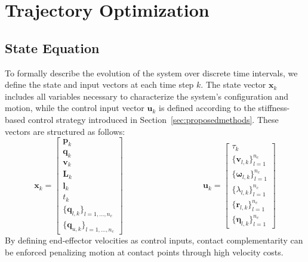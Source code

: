 \documentclass[main.tex]{subfiles}
\begin{document}
\begin{sloppypar}
\section{Trajectory Optimization}
\label{sec:formulation}
\subsection{State Equation}
To formally describe the evolution of the system over discrete time intervals, we define the state and input vectors at each time step \( k \). The state vector \( \mathbf{x}_k \) includes all variables necessary to characterize the system’s configuration and motion, while the control input vector \( \mathbf{u}_k \) is defined according to the stiffness-based control strategy introduced in Section~\ref{sec:proposedmethods}. These vectors are structured as follows:
\begin{equation}
\mathbf{x}_k =
\begin{bmatrix}
\mathbf{p}_k \\
\mathbf{q}_k \\
\mathbf{v}_k \\
\mathbf{L}_k \\
\mathbf{l}_k \\
t_k \\
\{\mathbf{q}_{l,k}\}_{l=1,\ldots,n_c} \\
\{\mathbf{q}_{u,k}\}_{l=1,\ldots,n_c}
\end{bmatrix}
\hspace{4cm}
\mathbf{u}_k =
\begin{bmatrix}
\tau_k \\
\{\mathbf{v}_{l,k}\}_{l=1}^{n_c} \\
\{\boldsymbol{\omega}_{l,k}\}_{l=1}^{n_c} \\
\{\lambda_{l,k}\}_{l=1}^{n_c} \\
\{\mathbf{r}_{l,k}\}_{l=1}^{n_c} \\
\{\boldsymbol{\eta}_{l,k}\}_{l=1}^{n_c}
\end{bmatrix}
\end{equation}
By defining end-effector velocities as control inputs, contact complementarity can be enforced penalizing motion at contact points through high velocity costs.

\end{sloppypar}
\end{document}
